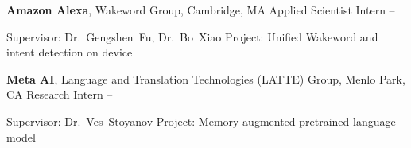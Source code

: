 \documentclass[letterpaper,MMMyyyy,nonstopmode]{simpleresumecv}
\begin{document}
\begin{Body}
\begin{Detail}
\end{Detail}

\BigGap
\Entry
\textbf{Amazon Alexa},
Wakeword Group, Cambridge, MA
\BulletItem
Applied Scientist Intern
\hfill
{} --
\begin{Detail}
\SubBulletItem
Supervisor:
Dr.~Gengshen~Fu, Dr.~Bo~Xiao
\SubBulletItem
Project:
Unified Wakeword and intent detection on device
\end{Detail}

\BigGap
\Entry
\textbf{Meta AI},
Language and Translation Technologies (LATTE) Group, Menlo Park, CA
\BulletItem
Research Intern
\hfill
{} --
\begin{Detail}
\SubBulletItem
Supervisor:
Dr.~Ves~Stoyanov
\SubBulletItem
Project:
Memory augmented pretrained language model
\end{Detail}


\end{Body}
\end{document}
